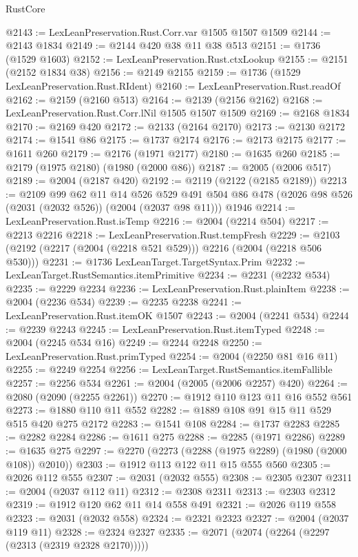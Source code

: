 \begin{lexlean}{RustCore}
\begin{coremodule}
@2143 := LexLeanPreservation.Rust.Corr.var @1505 @1507 @1509
@2144 := @2143 @1834
@2149 := @2144 @420 @38 @11 @38 @513
@2151 := @1736 (@1529 @1603)
@2152 := LexLeanPreservation.Rust.ctxLookup
@2155 := @2151 (@2152 @1834 @38)
@2156 := @2149 @2155
@2159 := @1736 (@1529 LexLeanPreservation.Rust.RIdent)
@2160 := LexLeanPreservation.Rust.readOf
@2162 := @2159 (@2160 @513)
@2164 := @2139 (@2156 @2162)
@2168 := LexLeanPreservation.Rust.Corr.lNil @1505 @1507 @1509
@2169 := @2168 @1834
@2170 := @2169 @420
@2172 := @2133 (@2164 @2170)
@2173 := @2130 @2172
@2174 := @1541 @86
@2175 := @1737 @2174
@2176 := @2173 @2175
@2177 := @1611 @260
@2179 := @2176 (@1971 @2177)
@2180 := @1635 @260
@2185 := @2179 (@1975 @2180) (@1980 (@2000 @86))
@2187 := @2005 (@2006 @517)
@2189 := @2004 (@2187 @420)
@2192 := @2119 (@2122 (@2185 @2189))
@2213 := @2109
    @99
    @62
    @11
    @14
    @526
    @529
    @491
    @504
    @86
    @478
    (@2026 @98 @526 (@2031 (@2032 @526)) (@2004 (@2037 @98 @11)))
    @1946
@2214 := LexLeanPreservation.Rust.isTemp
@2216 := @2004 (@2214 @504)
@2217 := @2213 @2216
@2218 := LexLeanPreservation.Rust.tempFresh
@2229 := @2103 (@2192 (@2217 (@2004 (@2218 @521 @529))) @2216 (@2004 (@2218 @506 @530)))
@2231 := @1736 LexLeanTarget.TargetSyntax.Prim
@2232 := LexLeanTarget.RustSemantics.itemPrimitive
@2234 := @2231 (@2232 @534)
@2235 := @2229 @2234
@2236 := LexLeanPreservation.Rust.plainItem
@2238 := @2004 (@2236 @534)
@2239 := @2235 @2238
@2241 := LexLeanPreservation.Rust.itemOK @1507
@2243 := @2004 (@2241 @534)
@2244 := @2239 @2243
@2245 := LexLeanPreservation.Rust.itemTyped
@2248 := @2004 (@2245 @534 @16)
@2249 := @2244 @2248
@2250 := LexLeanPreservation.Rust.primTyped
@2254 := @2004 (@2250 @81 @16 @11)
@2255 := @2249 @2254
@2256 := LexLeanTarget.RustSemantics.itemFallible
@2257 := @2256 @534
@2261 := @2004 (@2005 (@2006 @2257) @420)
@2264 := @2080 (@2090 (@2255 @2261))
@2270 := @1912 @110 @123 @11 @16 @552 @561
@2273 := @1880 @110 @11 @552
@2282 := @1889 @108 @91 @15 @11 @529 @515 @420 @275 @2172
@2283 := @1541 @108
@2284 := @1737 @2283
@2285 := @2282 @2284
@2286 := @1611 @275
@2288 := @2285 (@1971 @2286)
@2289 := @1635 @275
@2297 := @2270 (@2273 (@2288 (@1975 @2289) (@1980 (@2000 @108)) @2010))
@2303 := @1912 @113 @122 @11 @15 @555 @560
@2305 := @2026 @112 @555
@2307 := @2031 (@2032 @555)
@2308 := @2305 @2307
@2311 := @2004 (@2037 @112 @11)
@2312 := @2308 @2311
@2313 := @2303 @2312
@2319 := @1912 @120 @62 @11 @14 @558 @491
@2321 := @2026 @119 @558
@2323 := @2031 (@2032 @558)
@2324 := @2321 @2323
@2327 := @2004 (@2037 @119 @11)
@2328 := @2324 @2327
@2335 := @2071 (@2074 (@2264 (@2297 (@2313 (@2319 @2328 @2170)))))

\end{coremodule}
\end{lexlean}
